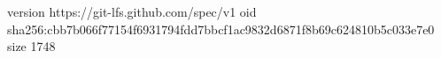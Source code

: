 version https://git-lfs.github.com/spec/v1
oid sha256:cbb7b066f77154f6931794fdd7bbcf1ac9832d6871f8b69c624810b5c033e7e0
size 1748
